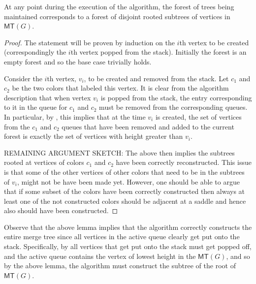 \documentclass[A4paper,11pt]{article}
\newcommand{\MT}{\ensuremath{\mathsf{MT}}\xspace}
\begin{document}
\begin{lemma}
 At any point during the execution of the algorithm, the forest of trees being maintained corresponds to a forest of disjoint rooted subtrees of vertices in $\MT(G)$.
\end{lemma}
\begin{proof}
 The statement will be proven by induction on the $i$th vertex to be created (correspondingly the $i$th vertex popped from the stack).
 Initially the forest is an empty forest and so the base case trivially holds.  
 
 Consider the $i$th vertex, $v_i$, to be created and removed from the stack.  Let $c_1$ and $c_2$ be the two colors that labeled this vertex.  It is clear from the algorithm description that when vertex $v_i$ is popped from the stack, the entry corresponding to it in the queue for $c_1$ and $c_2$ must be removed from the corresponding queues.  In particular, by , this implies that at the time $v_i$ is created, the set of vertices from the $c_1$ and $c_2$ queues that have been removed and added to the current forest is exactly the set of vertices with height greater than $v_i$.  
 
 REMAINING ARGUMENT SKETCH:  The above then implies the subtrees rooted at vertices of colors $c_1$ and $c_2$ have been correctly reconstructed.  This issue is that some of the other vertices of other colors that need to be in the subtrees of $v_i$, might not be have been made yet.  However, one should be able to argue that if some subset of the colors have been correctly constructed then always at least one of the not constructed colors should be adjacent at a saddle and hence also should have been constructed.
\end{proof}

Observe that the above lemma implies that the algorithm correctly constructs the entire merge tree since all vertices in the active queue clearly get put onto the stack.  Specifically, by  all vertices that get put onto the stack must get popped off, and the active queue contains the vertex of lowest height in the $\MT(G)$, and so by the above lemma, the algorithm must construct the subtree of the root of $\MT(G)$.
\end{document}
